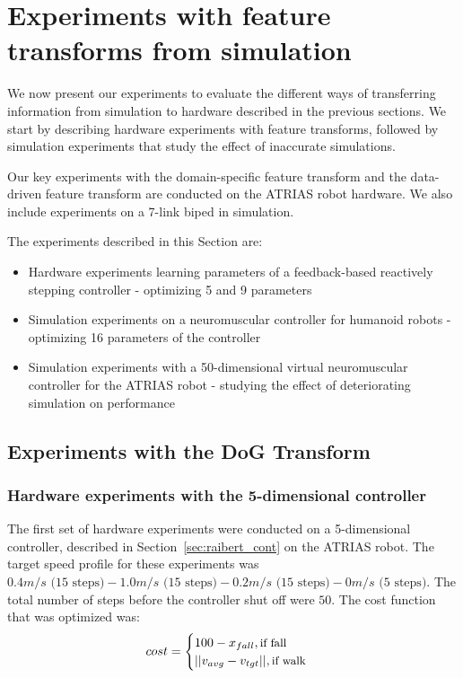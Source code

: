 \chapter{Experiments with feature transforms from simulation}
\label{chap:expts}

We now present our experiments to evaluate the different ways of transferring information from simulation to hardware described in the previous sections. We start by describing hardware experiments with feature transforms, followed by simulation experiments that study the effect of inaccurate simulations. 


Our key experiments with the domain-specific feature transform and the data-driven feature transform are conducted on the ATRIAS robot hardware. We also include experiments on a 7-link biped in simulation. 

The experiments described in this Section are:
\begin{itemize}
    \item Hardware experiments learning parameters of a feedback-based reactively stepping controller - optimizing 5 and 9 parameters 
    \item Simulation experiments on a neuromuscular controller for humanoid robots - optimizing 16 parameters of the controller
    \item Simulation experiments with a 50-dimensional virtual neuromuscular controller for the ATRIAS robot -  studying the effect of deteriorating simulation on performance
\end{itemize}

\section{Experiments with the DoG Transform}
\label{sec:dog_expts}
\subsection{Hardware experiments with the 5-dimensional controller}
\label{sec:hdw_5d}
The first set of hardware experiments were conducted on a 5-dimensional controller, described in Section~\ref{sec:raibert_cont} on the ATRIAS robot. The target speed profile for these experiments was $0.4 m/s \text{ (15 steps)} - 1.0 m/s \text{ (15 steps)} - 0.2 m/s \text{ (15 steps)} - 0 m/s \text{ (5 steps)}$. The total number of steps before the controller shut off were $50$. The cost function that was optimized was:
\begin{equation}
    \label{eq:hdw_cost}
    cost = 
    \begin{cases}
		100 - x_{fall} , \text{\small{if fall}} \\
		||v_{avg} - v_{tgt}||, \text{\small{if walk}}\\
	\end{cases}
\end{equation}

